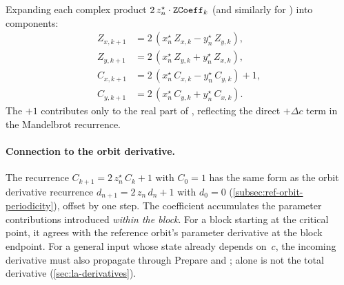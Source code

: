 Expanding each complex product $2\,z_n^\star \cdot \texttt{ZCoeff}_k$
(and similarly for ) into components:
\begin{align}
Z_{x,k+1} &= 2\,(x_n^\star\,Z_{x,k} - y_n^\star\,Z_{y,k}), \\
Z_{y,k+1} &= 2\,(x_n^\star\,Z_{y,k} + y_n^\star\,Z_{x,k}), \\
C_{x,k+1} &= 2\,(x_n^\star\,C_{x,k} - y_n^\star\,C_{y,k}) + 1, \\
C_{y,k+1} &= 2\,(x_n^\star\,C_{y,k} + y_n^\star\,C_{x,k}).
\end{align}
The $+1$ contributes only to the real part of , reflecting
the direct $+\Delta c$ term in the Mandelbrot recurrence.

\paragraph{Connection to the orbit derivative.}
The  recurrence
\(C_{k+1} = 2\,z_n^\star\,C_k + 1\) with \(C_0 = 1\)
has the same form as the orbit derivative recurrence
\(d_{n+1} = 2\,z_n\,d_n + 1\) with \(d_0 = 0\)
(\cref{subsec:ref-orbit-periodicity}), offset by one step.
The coefficient accumulates the parameter contributions introduced
\emph{within the block}. For a block starting at the critical point,
it agrees with the reference orbit's parameter derivative at the block
endpoint. For a general input whose state already depends on~$c$,
the incoming derivative must also propagate through Prepare and
;  alone is not the total derivative
(\cref{sec:la-derivatives}).

